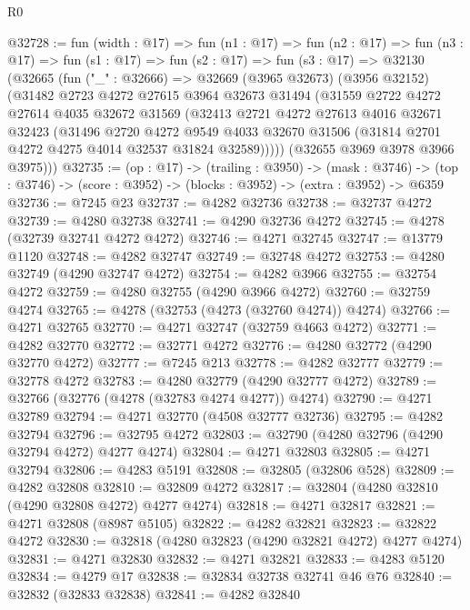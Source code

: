 \begin{lexlean}{R0}
\begin{coremodule}
@32728 := fun (width : @17) =>
  fun (n1 : @17) =>
  fun (n2 : @17) =>
  fun (n3 : @17) =>
  fun (s1 : @17) =>
  fun (s2 : @17) =>
  fun (s3 : @17) =>
  @32130
    (@32665
      (fun ("_" : @32666) =>
      @32669
        (@3965 @32673)
        (@3956 @32152)
        (@31482
          @2723
          @4272
          @27615
          @3964
          @32673
          @31494
          (@31559
            @2722
            @4272
            @27614
            @4035
            @32672
            @31569
            (@32413
              @2721
              @4272
              @27613
              @4016
              @32671
              @32423
              (@31496
                @2720
                @4272
                @9549
                @4033
                @32670
                @31506
                (@31814 @2701 @4272 @4275 @4014 @32537 @31824 @32589)))))
        (@32655 @3969 @3978 @3966 @3975)))
@32735 := (op : @17) ->
  (trailing : @3950) ->
  (mask : @3746) -> (top : @3746) -> (score : @3952) -> (blocks : @3952) -> (extra : @3952) -> @6359
@32736 := @7245 @23
@32737 := @4282 @32736
@32738 := @32737 @4272
@32739 := @4280 @32738
@32741 := @4290 @32736 @4272
@32745 := @4278 (@32739 @32741 @4272 @4272)
@32746 := @4271 @32745
@32747 := @13779 @1120
@32748 := @4282 @32747
@32749 := @32748 @4272
@32753 := @4280 @32749 (@4290 @32747 @4272)
@32754 := @4282 @3966
@32755 := @32754 @4272
@32759 := @4280 @32755 (@4290 @3966 @4272)
@32760 := @32759 @4274
@32765 := @4278 (@32753 (@4273 (@32760 @4274)) @4274)
@32766 := @4271 @32765
@32770 := @4271 @32747 (@32759 @4663 @4272)
@32771 := @4282 @32770
@32772 := @32771 @4272
@32776 := @4280 @32772 (@4290 @32770 @4272)
@32777 := @7245 @213
@32778 := @4282 @32777
@32779 := @32778 @4272
@32783 := @4280 @32779 (@4290 @32777 @4272)
@32789 := @32766 (@32776 (@4278 (@32783 @4274 @4277)) @4274)
@32790 := @4271 @32789
@32794 := @4271 @32770 (@4508 @32777 @32736)
@32795 := @4282 @32794
@32796 := @32795 @4272
@32803 := @32790 (@4280 @32796 (@4290 @32794 @4272) @4277 @4274)
@32804 := @4271 @32803
@32805 := @4271 @32794
@32806 := @4283 @5191
@32808 := @32805 (@32806 @528)
@32809 := @4282 @32808
@32810 := @32809 @4272
@32817 := @32804 (@4280 @32810 (@4290 @32808 @4272) @4277 @4274)
@32818 := @4271 @32817
@32821 := @4271 @32808 (@8987 @5105)
@32822 := @4282 @32821
@32823 := @32822 @4272
@32830 := @32818 (@4280 @32823 (@4290 @32821 @4272) @4277 @4274)
@32831 := @4271 @32830
@32832 := @4271 @32821
@32833 := @4283 @5120
@32834 := @4279 @17
@32838 := @32834 @32738 @32741 @46 @76
@32840 := @32832 (@32833 @32838)
@32841 := @4282 @32840

\end{coremodule}
\end{lexlean}

